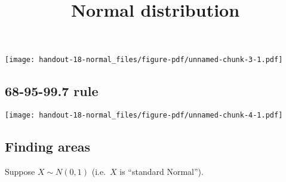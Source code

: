 \documentclass[
  letterpaper,
  DIV=11,
  numbers=noendperiod]{scrartcl}
\title{Normal distribution}
\author{}
\date{}
\begin{document}
\maketitle
\ifdefined\Shaded\renewenvironment{Shaded}{\begin{tcolorbox}[frame hidden, boxrule=0pt, interior hidden, enhanced, sharp corners, borderline west={3pt}{0pt}{shadecolor}, breakable]}{\end{tcolorbox}}\fi

\vspace{-2cm}

\texttt{[image: handout-18-normal\_files/figure-pdf/unnamed-chunk-3-1.pdf]}

\hypertarget{rule}{%
\subsection{68-95-99.7 rule}\label{rule}}

\texttt{[image: handout-18-normal\_files/figure-pdf/unnamed-chunk-4-1.pdf]}

\hypertarget{finding-areas}{%
\subsection{Finding areas}\label{finding-areas}}

Suppose \(X \sim N(0,1)\) (i.e.~\(X\) is ``standard Normal'').
\end{document}

